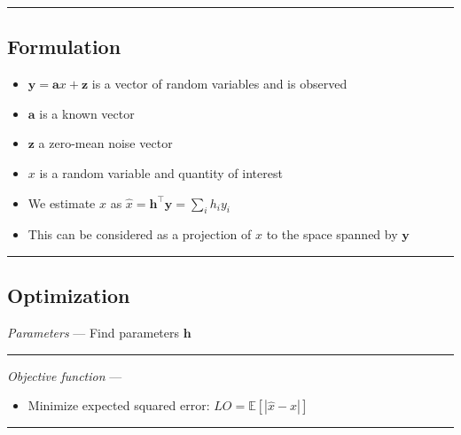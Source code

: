 {\color{black}\hrule height 0.001mm}

\subsection*{Formulation}

\begin{itemize}
    \item $\boldsymbol{y} = \boldsymbol{a}x + \boldsymbol{z}$ is a vector of random variables and is observed
    \item $\boldsymbol{a}$ is a known vector
    \item $\boldsymbol{z}$ a zero-mean noise vector
    \item $x$ is a random variable and quantity of interest
    \item We estimate $x$ as $\hat{x} = \boldsymbol{h}^\intercal \boldsymbol{y} = \sum_i h_i y_i$
    \item This can be considered as a projection of $x$ to the space spanned by $\boldsymbol{y}$
\end{itemize}

{\color{black}\hrule height 0.001mm}

\subsection*{Optimization}
\emph{Parameters} --- Find parameters $\boldsymbol{h}$

{\color{lightgray}\hrule height 0.001mm}

\emph{Objective function} --- 
\begin{itemize}
    \item Minimize expected squared error: $LO = \mathbb{E}[ | \hat{x} - x | ]$
\end{itemize}

{\color{lightgray}\hrule height 0.001mm}

